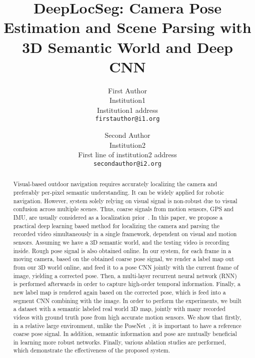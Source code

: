 \documentclass[10pt,twocolumn,letterpaper]{article}
\begin{document}
\title{DeepLocSeg: Camera Pose Estimation and Scene Parsing with 3D Semantic World and Deep CNN}

\author{First Author\\
Institution1\\
Institution1 address\\
{\tt\small firstauthor@i1.org}
\and
Second Author\\
Institution2\\
First line of institution2 address\\
{\tt\small secondauthor@i2.org}
}

\maketitle

\begin{abstract}
Visual-based outdoor navigation requires accurately localizing the camera and preferably per-pixel semantic understanding. It can be widely applied for robotic navigation.
However, system solely relying on visual signal is non-robust due to visual confusion across multiple scenes. 
Thus, coarse signals from motion sensors, \eg GPS and IMU, are usually considered as a localization prior~\cite{}.
In this paper, we propose a practical deep learning based method for localizing the camera and parsing the recorded video simultaneously in a single framework, dependent on visual and motion sensors.
Assuming we have a 3D semantic world, and the testing video is recording inside. Rough pose signal is also obtained online. In our system, for each frame in a moving camera, based on the obtained coarse pose signal, we render a label map out from our 3D world online, and feed it to a pose CNN jointly with the current frame of image, yielding a corrected pose. 
Then, a multi-layer recurrent neural network (RNN) is performed afterwards in order to capture high-order temporal information. 
Finally, a new label map is rendered again based on the corrected pose, which is feed into a segment CNN combining with the image.
In order to perform the experiments,  we built a dataset with a semantic labeled real world 3D map, jointly with many recorded videos with ground truth pose from high accurate motion sensors. We show that firstly, in a relative large environment, unlike the PoseNet~\cite{}, it is important to have a reference coarse pose signal. In addition, semantic information and pose are mutually beneficial in learning more robust networks. Finally, various ablation studies are performed, which demonstrate the effectiveness of the proposed system.
\end{abstract}
\end{document}
